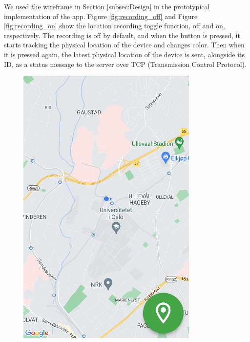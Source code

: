 \documentclass{article}
\begin{document}
We used the wireframe in Section \ref{subsec:Design} in the prototypical implementation of the app. Figure \ref{fig:recording_off} and Figure \ref{fig:recording_on} show the location recording toggle function, off and on, respectively. The recording is off by default, and when the button is pressed, it starts tracking the physical location of the device and changes color. Then when it is pressed again, the latest physical location of the device is sent, alongside its ID, as a status message to the server over TCP (Transmission Control Protocol).

\begin{figure}[H]
    \centering
    \begin{minipage}[c]{0.34\linewidth}
        \includegraphics[width=\linewidth]{graphics/recording_off.png}

\end{minipage}
\end{figure}
\end{document}
